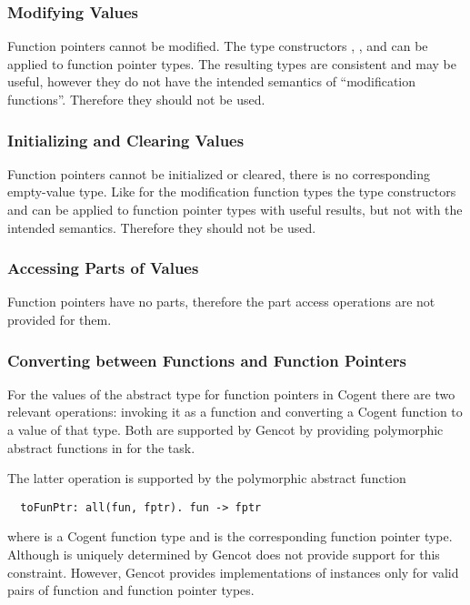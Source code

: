\subsubsection{Modifying Values}

Function pointers cannot be modified. The type constructors , , and 
can be applied to function pointer types. The resulting types are consistent and may be useful, however they do not have the
intended semantics of ``modification functions''. Therefore they should not be used.

\subsubsection{Initializing and Clearing Values}

Function pointers cannot be initialized or cleared, there is no corresponding empty-value type.
Like for the modification function types the type constructors
 and  can be applied to function pointer types with useful results, but not with the intended semantics.
Therefore they should not be used.

\subsubsection{Accessing Parts of Values}

Function pointers have no parts, therefore the part access operations are not provided for them.

\subsubsection{Converting between Functions and Function Pointers}

For the values of the abstract type for function pointers in Cogent there are two relevant operations: invoking
it as a function and converting a Cogent function to a value of that type. Both are supported by Gencot
by providing polymorphic abstract functions in  for the task.

The latter operation is supported by the polymorphic abstract function
\begin{verbatim}
  toFunPtr: all(fun, fptr). fun -> fptr
\end{verbatim}
where  is a Cogent function type and  is the corresponding function pointer type.
Although  is uniquely determined by  Gencot does not provide support for this constraint.
However, Gencot provides implementations of instances only for valid pairs of function and function pointer types.

